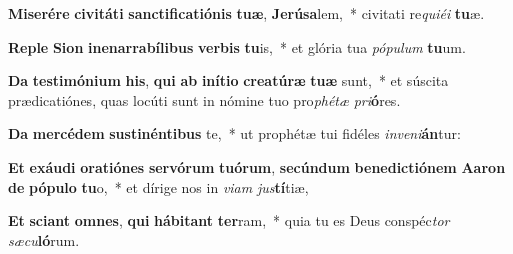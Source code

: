 \item \textbf{Mi}\textbf{se}\textbf{ré}\textbf{re} \textbf{ci}\textbf{vi}\textbf{tá}\textbf{ti} \textbf{sanc}\textbf{ti}\textbf{fi}\textbf{ca}\textbf{ti}\textbf{ó}\textbf{nis} \textbf{tu}\textbf{æ}, \textbf{Je}\textbf{rú}\textbf{sa}lem,~* civitati re\textit{qui}\textit{é}\textit{i} \textbf{tu}æ.
\item \textbf{Re}\textbf{ple} \textbf{Si}\textbf{on} \textbf{in}\textbf{e}\textbf{nar}\textbf{ra}\textbf{bí}\textbf{li}\textbf{bus} \textbf{ver}\textbf{bis} \textbf{tu}is,~* et glória tua \textit{pó}\textit{pu}\textit{lum} \textbf{tu}um.
\item \textbf{Da} \textbf{tes}\textbf{ti}\textbf{mó}\textbf{ni}\textbf{um} \textbf{his}, \textbf{qui} \textbf{ab} \textbf{in}\textbf{í}\textbf{ti}\textbf{o} \textbf{cre}\textbf{a}\textbf{tú}\textbf{ræ} \textbf{tu}\textbf{æ} sunt,~* et súscita prædicatiónes, quas locúti sunt in nómine tuo pro\textit{phé}\textit{tæ} \textit{pri}\textbf{ó}res.
\item \textbf{Da} \textbf{mer}\textbf{cé}\textbf{dem} \textbf{sus}\textbf{ti}\textbf{nén}\textbf{ti}\textbf{bus} te,~* ut prophétæ tui fidéles \textit{in}\textit{ve}\textit{ni}\textbf{án}tur:
\item \textbf{Et} \textbf{ex}\textbf{áu}\textbf{di} \textbf{o}\textbf{ra}\textbf{ti}\textbf{ó}\textbf{nes} \textbf{ser}\textbf{vó}\textbf{rum} \textbf{tu}\textbf{ó}\textbf{rum}, \textbf{se}\textbf{cún}\textbf{dum} \textbf{be}\textbf{ne}\textbf{dic}\textbf{ti}\textbf{ó}\textbf{nem} \textbf{A}\textbf{a}\textbf{ron} \textbf{de} \textbf{pó}\textbf{pu}\textbf{lo} \textbf{tu}o,~* et dírige nos in \textit{vi}\textit{am} \textit{jus}\textbf{tí}tiæ,
\item \textbf{Et} \textbf{sci}\textbf{ant} \textbf{om}\textbf{nes}, \textbf{qui} \textbf{há}\textbf{bi}\textbf{tant} \textbf{ter}ram,~* quia tu es Deus conspéc\textit{tor} \textit{sæ}\textit{cu}\textbf{ló}rum.
